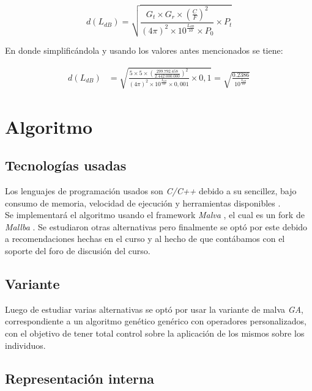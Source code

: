 \documentclass[journal]{IEEEtran}
\begin{document}
$$d(L_{dB}) = \sqrt {\frac {G_t \times G_r \times (\frac {C} {F})^2} {(4 \pi)^2 \times 10^{\frac {L_{dB}} {10}} \times P_0} \times P_t}$$

En donde simplificándola y usando los valores antes mencionados se tiene:

\begin{equation*}
\begin{split}
d(L_{dB}) &= \sqrt {\frac {5 \times 5 \times (\frac {299.792.458} {2.442.000.000})^2} {(4 \pi)^2 \times 10^{\frac {L_{dB}} {10}} \times 0,001} \times 0,1} = \sqrt {\frac {0.2386} {10^{\frac {L_{dB}} {10}}}}
\end{split}
\end{equation*}

\section{Algoritmo}

\subsection{Tecnologías usadas}

Los lenguajes de programación usados son \emph{C/C++} \cite{c} \cite{c++} debido a su sencillez, bajo consumo de memoria, velocidad de ejecución y herramientas disponibles \cite{why:c:c++}.\\

Se implementará el algoritmo usando el framework \emph{Malva} \cite{malva}, el cual es un fork de \emph{Mallba} \cite{mallba}. Se estudiaron otras alternativas pero finalmente se optó por este debido a recomendaciones hechas en el curso y al hecho de que contábamos con el soporte del foro de discusión del curso.\\

\subsection{Variante}

Luego de estudiar varias alternativas se optó por usar la variante de malva \emph{GA}, correspondiente a un algoritmo genético genérico con operadores personalizados, con el objetivo de tener total control sobre la aplicación de los mismos sobre los individuos.\\

\subsection{Representación interna}
\end{document}
